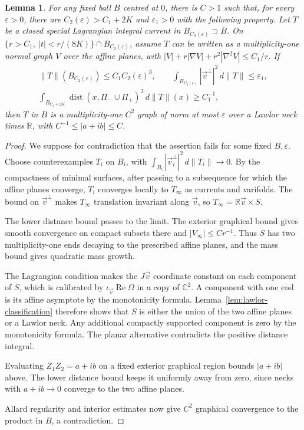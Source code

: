 \documentclass[11pt,a4paper]{article}
\numberwithin{equation}{section}
\newtheorem{lemma}[theorem]{Lemma}
\theoremstyle{definition}
\theoremstyle{remark}
\newcommand{\R}{\mathbb R}
\newcommand{\C}{\mathbb C}
\newcommand{\dist}{\operatorname{dist}}
\newcommand{\Ree}{\operatorname{Re}}
\begin{document}
	\begin{lemma}\label{lem:effective-lawlor}
		For any fixed ball $B$ centred at $0$, there is $C>1$ such that, for every
		$\varepsilon>0$, there are $C_2(\varepsilon)>C_1+2K$ and $\varepsilon_1>0$ with the following property.
		Let $T$ be a closed special Lagrangian integral current in
		$B_{C_2(\varepsilon)}\supset\overline B$. On
		$\{r>C_1,\ |t|<r/(8K)\}\cap B_{C_2(\varepsilon)}$, assume $T$ can be written
		as a multiplicity-one normal graph $V$ over the affine planes, with
		$|V|+r|\nabla V|+r^2|\nabla^2V|\le C_1/r$.
		If
		\[
		\begin{gathered}
			\|T\|(B_{C_2(\varepsilon)})\le C_1C_2(\varepsilon)^3,\qquad
			\int_{B_{C_2(\varepsilon)}}|\vec v^\perp|^2\,d\|T\|\le\varepsilon_1,\\
			\int_{B_{C_1+2K}}\dist(x,\Pi_-\cup\Pi_+)^2\,d\|T\|(x)\ge C_1^{-1},
		\end{gathered}
		\]
		then $T$ in $B$ is a multiplicity-one $C^2$ graph of norm at most
		$\varepsilon$ over a Lawlor neck times $\R$, with $C^{-1}\le |a+ib|\le C$.
	\end{lemma}
	
	\begin{proof}
		We suppose for contradiction that the assertion fails for some fixed
		$B,\varepsilon$. Choose counterexamples $T_i$ on $B_i$, with
		$\int_{B_i}|\vec v_i^\perp|^2\,d\|T_i\|\to0$.
		By the compactness of minimal surfaces, after passing to a subsequence
		for which the affine planes converge, $T_i$ converges locally to $T_\infty$
		as currents and varifolds.
		The bound on $\vec v^\perp$ makes $T_\infty$ translation invariant
		along $\vec v$, so $T_\infty=\R\vec v\times S$.
		
		The lower distance bound passes to the limit.
		The exterior graphical bound gives smooth convergence on compact subsets
		there and $|V_\infty|\le Cr^{-1}$.
		Thus $S$ has two multiplicity-one ends decaying to the prescribed
		affine planes, and the mass bound gives quadratic mass growth.
		
		The Lagrangian condition makes the $J\vec v$ coordinate constant on
		each component of $S$, which is calibrated by
		$\iota_{\vec v}\Ree\Omega$ in a copy of $\C^2$.
		A component with one end is its affine asymptote by the monotonicity formula.
		Lemma~\ref{lem:lawlor-classification} therefore shows that $S$ is either
		the union of the two affine planes or a Lawlor neck. Any additional compactly supported
		component is zero by the monotonicity formula. The planar alternative contradicts
		the positive distance integral.
		
		Evaluating $Z_1Z_2=a+ib$ on a fixed exterior graphical region bounds
		$|a+ib|$ above. The lower distance bound keeps it uniformly away from
		zero, since necks with $a+ib\to0$ converge to the two affine planes.
		
		Allard regularity and interior estimates now give $C^2$ graphical
		convergence to the product in $B$, a contradiction.
	\end{proof}
	
\end{document}
